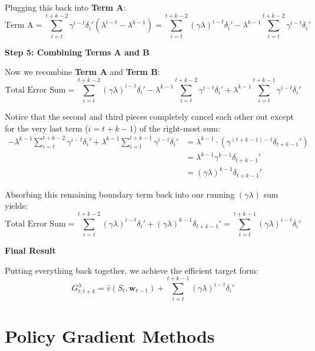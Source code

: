 \documentclass{article}
\begin{document}
Plugging this back into \textbf{Term A}:
\begin{equation}
\text{Term A} = \sum_{i=t}^{t+k-2} \gamma^{i-t} \delta_i' \left( \lambda^{i-t} - \lambda^{k-1} \right) = \sum_{i=t}^{t+k-2} (\gamma\lambda)^{i-t} \delta_i' - \lambda^{k-1} \sum_{i=t}^{t+k-2} \gamma^{i-t} \delta_i'
\end{equation}

\textbf{Step 5: Combining Terms A and B}

Now we recombine \textbf{Term A} and \textbf{Term B}:
\begin{equation}
\text{Total Error Sum} = \sum_{i=t}^{t+k-2} (\gamma\lambda)^{i-t} \delta_i' - \lambda^{k-1} \sum_{i=t}^{t+k-2} \gamma^{i-t} \delta_i' + \lambda^{k-1} \sum_{i=t}^{t+k-1} \gamma^{i-t} \delta_i'
\end{equation}

Notice that the second and third pieces completely cancel each other out except for the very last term ($i = t+k-1$) of the right-most sum:
\begin{align*}
-\lambda^{k-1} \sum_{i=t}^{t+k-2} \gamma^{i-t} \delta_i' + \lambda^{k-1} \sum_{i=t}^{t+k-1} \gamma^{i-t} \delta_i' &= \lambda^{k-1} \cdot \left( \gamma^{(t+k-1)-t} \delta_{t+k-1}' \right) \\
&= \lambda^{k-1} \gamma^{k-1} \delta_{t+k-1}' \\
&= (\gamma\lambda)^{k-1} \delta_{t+k-1}'
\end{align*}

Absorbing this remaining boundary term back into our running $(\gamma\lambda)$ sum yields:
\begin{equation}
\text{Total Error Sum} = \sum_{i=t}^{t+k-2} (\gamma\lambda)^{i-t} \delta_i' + (\gamma\lambda)^{k-1} \delta_{t+k-1}' = \sum_{i=t}^{t+k-1} (\gamma\lambda)^{i-t} \delta_i'
\end{equation}

\textbf{Final Result}

Putting everything back together, we achieve the efficient target form:
\begin{equation}
G_{t:t+k}^\lambda = \hat{v}(S_t, \mathbf{w}_{t-1}) + \sum_{i=t}^{t+k-1} (\gamma \lambda)^{i-t} \delta_i'
\end{equation}

\section{Policy Gradient Methods}
\end{document}
